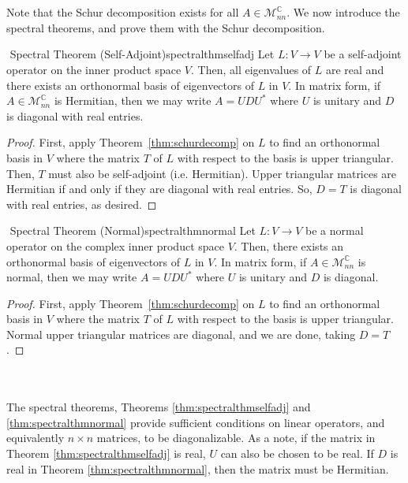         \vphantom
        \\
        \\
        Note that the Schur decomposition exists for all \(A\in\mathcal{M}_{nn}^\mathbb{C}\). We now introduce the spectral theorems, and prove them with the Schur decomposition.
        \begin{theorem}{\Stop\,\,Spectral Theorem (Self-Adjoint)}{spectralthmselfadj}
            Let \(L:V\to V\) be a self-adjoint operator on the inner product space \(V\). Then, all eigenvalues of \(L\) are real and there exists an orthonormal basis of eigenvectors of \(L\) in \(V\). In matrix form, if \(A\in\mathcal{M}_{nn}^\mathbb{C}\) is Hermitian, then we may write \(A=UDU^*\) where \(U\) is unitary and \(D\) is diagonal with real entries.
            \begin{proof}
                First, apply Theorem~\ref{thm:schurdecomp} on \(L\) to find an orthonormal basis in \(V\) where the matrix \(T\) of \(L\) with respect to the basis is upper triangular. Then, \(T\) must also be self-adjoint (i.e. Hermitian). Upper triangular matrices are Hermitian if and only if they are diagonal with real entries. So, \(D=T\) is diagonal with real entries, as desired.
            \end{proof}
        \end{theorem}
        \begin{theorem}{\Stop\,\,Spectral Theorem (Normal)}{spectralthmnormal}
            Let \(L:V\to V\) be a normal operator on the complex inner product space \(V\). Then, there exists an orthonormal basis of eigenvectors of \(L\) in \(V\). In matrix form, if \(A\in\mathcal{M}_{nn}^\mathbb{C}\) is normal, then we may write \(A=UDU^*\) where \(U\) is unitary and \(D\) is diagonal.
            \begin{proof}
                First, apply Theorem~\ref{thm:schurdecomp} on \(L\) to find an orthonormal basis in \(V\) where the matrix \(T\) of \(L\) with respect to the basis is upper triangular. Normal upper triangular matrices are diagonal, and we are done, taking \(D=T\).
            \end{proof}
        \end{theorem}
        \vphantom
        \\
        \\
        The spectral theorems, Theorems \ref{thm:spectralthmselfadj} and \ref{thm:spectralthmnormal} provide sufficient conditions on linear operators, and equivalently \(n\times n\) matrices, to be diagonalizable. As a note, if the matrix in Theorem \ref{thm:spectralthmselfadj} is real, \(U\) can also be chosen to be real. If \(D\) is real in Theorem \ref{thm:spectralthmnormal}, then the matrix must be Hermitian.
